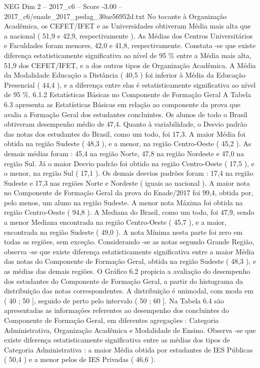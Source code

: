 \begin{textsample}{NEG Dim 2 – 2017\_c6 – Score -3.00 – 2017\_c6/enade\_2017\_pedag\_30ae56952d.txt}
No tocante à Organização Acadêmica, os CEFET/IFET e as Universidades obtiveram Média mais alta que a nacional ( 51,9 e 42,9, respectivamente ).
As Médias dos Centros Universitários e Faculdades foram menores, 42,0 e 41,8, respectivamente.
Constata -se que existe diferença estatisticamente significativa ao nível de 95 \% entre a Média mais alta, 51,9 dos CEFET/IFET, e a dos outros tipos de Organização Acadêmica.
A Média da Modalidade Educação a Distância ( 40,5 ) foi inferior à Média da Educação Presencial ( 44,4 ), e a diferença entre elas é estatisticamente significativa ao nível de 95 \%. 6.1.2 Estatísticas Básicas no Componente de Formação Geral A Tabela 6.3 apresenta as Estatísticas Básicas em relação ao componente da prova que avalia a Formação Geral dos estudantes concluintes.
Os alunos de todo o Brasil obtiveram desempenho médio de 47,4.
Quanto à variabilidade, o Desvio padrão das notas dos estudantes do Brasil, como um todo, foi 17,3.
A maior Média foi obtida na região Sudeste ( 48,3 ), e a menor, na região Centro-Oeste ( 45,2 ).
As demais médias foram : 45,4 na região Norte, 47,8 na região Nordeste e 47,0 na região Sul.
Já o maior Desvio padrão foi obtido na região Centro-Oeste ( 17,5 ), e o menor, na região Sul ( 17,1 ).
Os demais desvios padrões foram : 17,4 na região Sudeste e 17,3 nas regiões Norte e Nordeste ( iguais ao nacional ).
A maior nota no Componente de Formação Geral da prova do Enade/2017 foi 99,4, obtida por, pelo menos, um aluno na região Sudeste.
A menor nota Máxima foi obtida na região Centro-Oeste ( 94,8 ).
A Mediana do Brasil, como um todo, foi 47,9, sendo a menor Mediana encontrada na região Centro-Oeste ( 45,7 ), e a maior, encontrada na região Sudeste ( 49,0 ).
A nota Mínima nesta parte foi zero em todas as regiões, sem exceção.
Considerando -se as notas segundo Grande Região, observa -se que existe diferença estatisticamente significativa entre a maior Média das notas do Componente de Formação Geral, obtida na região Sudeste ( 48,3 ), e as médias das demais regiões.
O Gráfico 6.2 propicia a avaliação do desempenho dos estudantes do Componente de Formação Geral, a partir do histograma da distribuição das notas correspondentes.
A distribuição é unimodal, com moda em ( 40 ; 50 ], seguido de perto pelo intervalo ( 50 ; 60 ].
Na Tabela 6.4 são apresentadas as informações referentes ao desempenho dos concluintes do Componente de Formação Geral, em diferentes agregações : Categoria Administrativa, Organização Acadêmica e Modalidade de Ensino.
Observa -se que existe diferença estatisticamente significativa entre as médias dos tipos de Categoria Administrativa : a maior Média obtida por estudantes de IES Públicas ( 50,4 ) e a menor pelos de IES Privadas ( 46,6 ).

\end{textsample}
